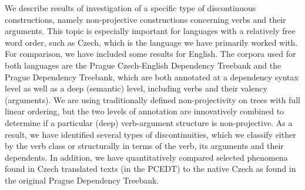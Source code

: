 We describe results of investigation of a specific type of discontinuous constructions, namely non-projective constructions concerning verbs and their arguments. This topic is especially important for languages with a relatively free word order, such as Czech, which is the language we have primarily worked with. For comparison, we have included some results for English. The corpora used for both languages are the Prague Czech-English Dependency Treebank and the Prague Dependency Treebank, which are both annotated at a dependency syntax level as well as a deep (semantic) level, including verbs and their valency (arguments). We are using traditionally defined non-projectivity on trees with full linear ordering, but the two levels of annotation are innovatively combined to determine if a particular (deep) verb-argument structure is non-projective. As a result, we have identified several types of discontinuities, which we classify either by the verb class or structurally in terms of the verb, its arguments and their dependents. In addition, we have quantitatively compared selected phenomena found in Czech translated texts (in the PCEDT) to the native Czech as found in the original Prague Dependency Treebank.
